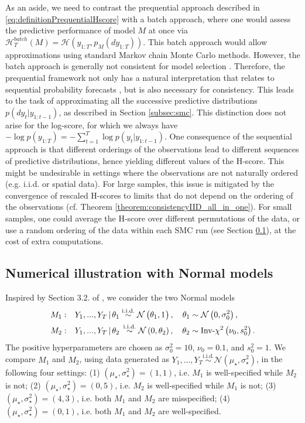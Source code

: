\documentclass[12pt]{article}
\theoremstyle{plain}
\theoremstyle{definition}
\begin{document}
	As an aside, we need to contrast the prequential approach described in \eqref{eq:definitionPrequentialHscore} with a
	batch approach, where one would assess the predictive performance of model $M$ at once via $\mathcal{H}_{T}^{batch}(M) = \mathcal{H}\left(y_{1:T},p_M(dy_{1:T})\right)$.
	This batch approach would allow approximations using standard Markov chain Monte Carlo
	methods. 
	However, the batch approach is generally not consistent for model selection \citep[see Section 8.1 in][]{dawid2015}.
	Therefore, the prequential
	framework not only has a natural interpretation that relates to sequential probability
	forecasts \citep{dawid1984}, but is also necessary for consistency. This leads to the task of 
	approximating all the successive predictive distributions
	$p(dy_t|y_{1:t-1})$, as described in Section \ref{subsec:smc}. This distinction does not arise for the log-score, for which we always have $-\log p(y_{1:T})=-\sum_{t=1}^T \log p(y_t|y_{1:t-1})$. 
	One consequence of the sequential approach is that different orderings of the observations lead to different sequences of predictive distributions, 
	hence yielding different values of the H-score. This might be undesirable in settings where the observations are not naturally ordered (e.g.\! i.i.d.\! or spatial data). For large samples, this issue is mitigated by the convergence of rescaled H-scores 
	to limits that do not depend on the ordering of the observations (cf. Theorem \ref{theorem:consistencyIID_all_in_one}). For small samples, one could average the H-score over different permutations of the data, or use a random ordering of the data within each SMC run (see Section \ref{sec:consistencyNumericalExample}), at the cost of extra computations.
	
	
	\subsection{Numerical illustration with Normal models}
	\label{sec:consistencyNumericalExample}
	
	Inspired by Section 3.2. of \citet{ohagan1995}, we consider the two Normal models
	\begin{align*}
	M_1:&\quad Y_1,...,Y_T\,|\,\theta_1 \stackrel{\text{i.i.d.}}{\sim} \mathcal{N}\left(\theta_1,1^{\vphantom{2}}\right) ,\quad  \theta_1 \sim \mathcal{N}\left(0,\sigma_0^2\right),
	\\
	M_2:&\quad Y_1,...,Y_T\,|\,\theta_2 \,\stackrel{\text{i.i.d.}}{\sim} \mathcal{N}\left(0,\theta_2\right) ,\quad  \theta_2 \sim \text{Inv-}\chi^2\left(\nu_0,s_0^2\right).
	\end{align*}
	The positive hyperparameters are chosen as $\sigma_0^2 =
	10$, $\nu_0 = 0.1$, and $s_0^2 = 1$. We compare $M_1$ and $M_2$, using data generated as $Y_1,...,Y_T \stackrel{\text{i.i.d.}}{\sim} \mathcal{N}(\mu_\star,\sigma_\star^2)$, in the following four settings: (1) $(\mu_\star,\sigma_\star^2)=(1,1)$, i.e.\! $M_1$ is well-specified while $M_2$ is not; (2) $(\mu_\star,\sigma_\star^2)=(0,5)$, i.e.\! $M_2$ is well-specified while $M_1$ is not; (3) $(\mu_\star,\sigma_\star^2)=(4,3)$, i.e.\! both $M_1$ and $M_2$ are misspecified; (4) $(\mu_\star,\sigma_\star^2)=(0,1)$, i.e.\! both $M_1$ and $M_2$ are well-specified.
	
\end{document}

